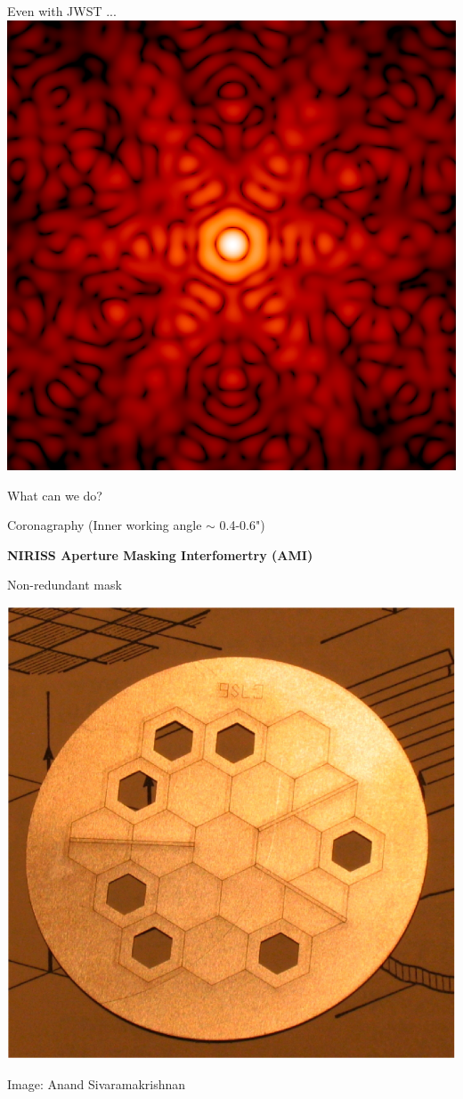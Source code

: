 \documentclass[10pt]{beamer}
\newenvironment{wideitemize}{\itemize\addtolength{\itemsep}{10pt}}{\enditemize}
\begin{document}
\begin{frame}{}
  \begin{center}
    \LARGE
    Even with JWST ...
    \includegraphics[width=0.7\linewidth]{figures/clearp_psf.png}
  \end{center}
\end{frame}

\begin{frame}{What can we do?}
  \large
  \begin{wideitemize}
    \item Coronagraphy (Inner working angle $\sim$ 0.4-0.6")
    \item \textbf{NIRISS Aperture Masking Interfomertry (AMI)}
  \end{wideitemize}
\end{frame}

\begin{frame}{Non-redundant mask}

  \begin{center}
    \includegraphics[width=0.6\linewidth]{figures/AMI_mask_prototype.jpg}
  \end{center}

  \footnotesize Image: Anand Sivaramakrishnan
\end{frame}
\end{document}
